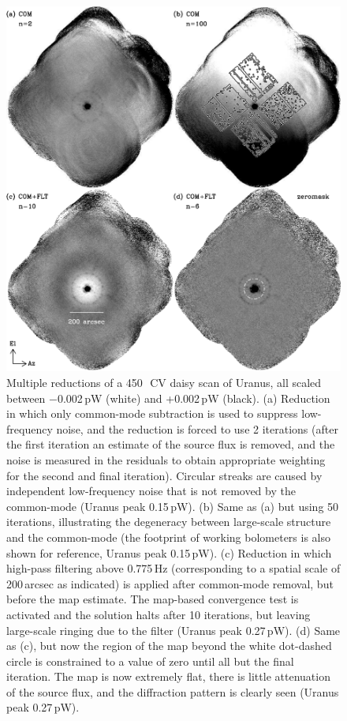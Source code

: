 \documentclass[useAMS,usenatbib,nofootinbib]{mn2e}
\begin{document}
\begin{figure}
\centering
\includegraphics[width=\linewidth]{pointmaps.pdf}
\caption{Multiple reductions of a 450\,\micron\ CV daisy scan of
  Uranus, all scaled between $-$0.002\,pW (white) and +0.002\,pW
  (black). (a) Reduction in which only common-mode subtraction is used
  to suppress low-frequency noise, and the reduction is forced to use
  2 iterations (after the first iteration an estimate of the source
  flux is removed, and the noise is measured in the residuals to
  obtain appropriate weighting for the second and final
  iteration). Circular streaks are caused by independent low-frequency
  noise that is not removed by the common-mode (Uranus peak
  0.15\,pW). (b) Same as (a) but using 50 iterations, illustrating the
  degeneracy between large-scale structure and the common-mode (the
  footprint of working bolometers is also shown for reference, Uranus
  peak 0.15\,pW). (c) Reduction in which high-pass filtering above
  0.775\,Hz (corresponding to a spatial scale of 200\,arcsec as
  indicated) is applied after common-mode removal, but before the map
  estimate. The map-based convergence test is activated and the
  solution halts after 10 iterations, but leaving large-scale ringing
  due to the filter (Uranus peak 0.27\,pW). (d) Same as (c), but now
  the region of the map beyond the white dot-dashed circle is
  constrained to a value of zero until all but the final iteration.
  The map is now extremely flat, there is little attenuation of the
  source flux, and the diffraction pattern is clearly seen (Uranus
  peak 0.27\,pW).}
\label{fig:pointmaps}
\end{figure}
\end{document}
